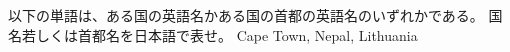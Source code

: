 \documentclass{jarticle}
\begin{document}
\vspace*{\fill}
\begin{center}
以下の単語は、ある国の英語名かある国の首都の英語名のいずれかである。
国名若しくは首都名を日本語で表せ。
Cape Town, Nepal, Lithuania
\end{center}
\vspace*{\fill}
\end{document}
